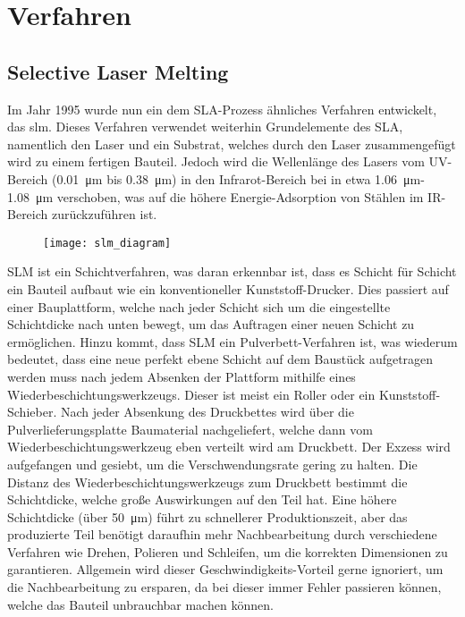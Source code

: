 \documentclass[../main.tex]{subfiles}
\begin{document}
\section{Verfahren}
\subsection{Selective Laser Melting}
Im Jahr 1995 wurde nun ein dem SLA-Prozess ähnliches Verfahren entwickelt, das \acrfull{slm}. Dieses Verfahren verwendet weiterhin Grundelemente des SLA, namentlich den Laser und ein Substrat, welches durch den Laser zusammengefügt wird zu einem fertigen Bauteil. 
Jedoch wird die Wellenlänge des Lasers vom UV-Bereich (\qty{0.01}{\micro\meter} bis \qty{0.38}{\micro\meter}) in den Infrarot-Bereich bei in etwa \qty{1.06}{\micro\meter}-\qty{1.08}{\micro\meter} verschoben, was auf die höhere Energie-Adsorption von Stählen im IR-Bereich zurückzuführen ist.\parencite{3FAKTUR_1}
\begin{figure}[h]
\begin{center}
	\texttt{[image: slm\_diagram]}
	\label{img:slm_diagram}
\end{center}
\end{figure}	
SLM ist ein Schichtverfahren, was daran erkennbar ist, dass es Schicht für Schicht ein Bauteil aufbaut wie ein konventioneller Kunststoff-Drucker. Dies passiert auf einer Bauplattform, welche nach jeder Schicht sich um die eingestellte Schichtdicke nach unten bewegt, um das Auftragen einer neuen Schicht zu ermöglichen. 
Hinzu kommt, dass SLM ein Pulverbett-Verfahren ist, was wiederum bedeutet, dass eine neue perfekt ebene Schicht auf dem Baustück aufgetragen werden muss nach jedem Absenken der Plattform mithilfe eines Wiederbeschichtungswerkzeugs.
Dieser ist meist ein Roller oder ein Kunststoff-Schieber. Nach jeder Absenkung des Druckbettes wird über die Pulverlieferungsplatte Baumaterial nachgeliefert, welche dann vom Wiederbeschichtungswerkzeug eben verteilt wird am Druckbett. Der Exzess wird aufgefangen und gesiebt, um die Verschwendungsrate gering zu halten.  
Die Distanz des Wiederbeschichtungswerkzeugs zum Druckbett bestimmt die Schichtdicke, welche große Auswirkungen auf den Teil hat. Eine höhere Schichtdicke (über \qty{50}{\micro\meter}) führt zu schnellerer Produktionszeit, aber das produzierte Teil benötigt daraufhin mehr Nachbearbeitung durch verschiedene Verfahren wie Drehen, Polieren und Schleifen, um die korrekten Dimensionen zu garantieren. Allgemein wird dieser Geschwindigkeits-Vorteil gerne ignoriert, um die Nachbearbeitung zu ersparen, da bei dieser immer Fehler passieren können, welche das Bauteil unbrauchbar machen können.
\end{document}
